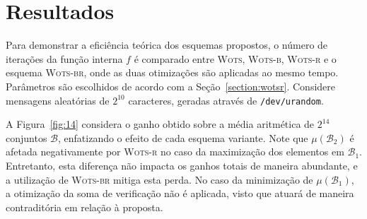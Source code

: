 \documentclass{ufsctex/ufsctex}
\newcommand{\bone}{\mathcal{B}_{1}}
\newcommand{\btwo}{\mathcal{B}_{2}}
\newcommand{\wots}{\textsc{Wots}}
\newcommand{\wotsb}{\textsc{Wots-b}}
\newcommand{\wotsr}{\textsc{Wots-r}}
\newcommand{\wotsbr}{\textsc{Wots-br}}
\begin{document}
\section{Resultados}\label{section:results}

Para demonstrar a eficiência teórica dos esquemas propostos, o número de
iterações da função interna $f$ é comparado entre \wots{}, \wotsb{}, \wotsr{} e
o esquema \wotsbr{}, onde as duas otimizações são aplicadas ao mesmo tempo.
Parâmetros são escolhidos de acordo com a Seção~\ref{section:wotsr}. Considere
mensagens aleatórias de $2^{10}$ caracteres, geradas através de
\texttt{/dev/urandom}.

A Figura~\ref{fig:14} considera o ganho obtido sobre a média aritmética de
$2^{14}$ conjuntos $\mathcal{B}$, enfatizando o efeito de cada esquema
variante. Note que $\mu(\btwo{})$ é afetada negativamente por \wotsr{} no caso
da maximização dos elementos em $\bone{}$. Entretanto, esta diferença não
impacta os ganhos totais de maneira abundante, e a utilização de \wotsbr{}
mitiga esta perda. No caso da minimização de $\mu(\bone{})$, a otimização da
soma de verificação não é aplicada, visto que atuará de maneira contraditória
em relação à proposta.
\end{document}
